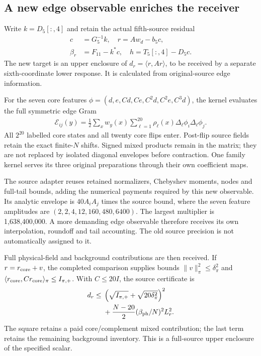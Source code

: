 \subsection{A new edge observable enriches the receiver}

Write $k=D_5[:,4]$ and retain the actual fifth-source residual
\begin{align}
 c&=G_5^{-1}k,\quad r=Aw_d-b_5c,\\
 \beta_r&=F_{11}-k^*c,\quad h=T_5[:,4]-D_5c.
\end{align}
The new target is an upper enclosure of $d_r=\langle r,Ar\rangle$, to be received by a separate sixth-coordinate lower response. It is calculated from original-source edge information.

For the seven core features $\phi=(d,e,Cd,Ce,C^2d,C^2e,C^3d)$, the kernel evaluates the full symmetric edge Gram
\begin{align}
 \mathcal E_{ij}(y)=\frac12\sum_x w_y(x)
 \sum_{\ell=1}^{20}\rho_\ell(x)
 \Delta_\ell\phi_i\Delta_\ell\phi_j.
\end{align}
All $2^{20}$ labelled core states and all twenty core flips enter. Post-flip source fields retain the exact finite-$N$ shifts. Signed mixed products remain in the matrix; they are not replaced by isolated diagonal envelopes before contraction. One family kernel serves its three original preparations through their own coefficient maps.

The source adapter reuses retained normalizers, Chebyshev moments, nodes and full-tail bounds, adding the numerical payments required by this new observable. Its analytic envelope is $40A_iA_j$ times the source bound, where the seven feature amplitudes are $(2,2,4,12,160,480,6400)$. The largest multiplier is 1,638,400,000. A more demanding edge observable therefore receives its own interpolation, roundoff and tail accounting. The old source precision is not automatically assigned to it.

Full physical-field and background contributions are then received. If $r=r_{\rm core}+v$, the completed comparison supplies bounds $\|v\|_\pi^2\leq\delta_\pi^2$ and $\langle r_{\rm core},Cr_{\rm core}\rangle_\pi\leq I_{\pi,+}$. With $C\leq20I$, the source certificate is
\begin{align}
 d_r\leq{}&\left(\sqrt{I_{\pi,+}}+\sqrt{20\delta_\pi^2}\right)^2\notag\\
 &+\frac{N-20}{2}(\beta_{\rm ph}/N)^2L_r^2.
\end{align}
The square retains a paid core/complement mixed contribution; the last term retains the remaining background inventory. This is a full-source upper enclosure of the specified scalar.

